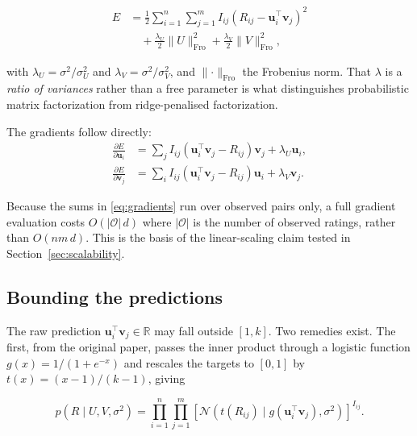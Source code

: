 \documentclass[conference]{IEEEtran}
\begin{document}
\begin{equation}
\begin{split}
  E &= \frac{1}{2}\sum_{i=1}^{n}\sum_{j=1}^{m} I_{ij}\left(R_{ij} - \mathbf{u}_i^\top\mathbf{v}_j\right)^2\\
    &\quad + \frac{\lambda_U}{2}\lVert U\rVert_{\mathrm{Fro}}^2
           + \frac{\lambda_V}{2}\lVert V\rVert_{\mathrm{Fro}}^2,
\end{split}
\label{eq:objective}
\end{equation}

with $\lambda_U = \sigma^2/\sigma_U^2$ and $\lambda_V = \sigma^2/\sigma_V^2$, and
$\lVert\cdot\rVert_{\mathrm{Fro}}$ the Frobenius norm. That $\lambda$ is a \emph{ratio of
variances} rather than a free parameter is what distinguishes probabilistic matrix
factorization from ridge-penalised factorization.

The gradients follow directly:
\begin{equation}
\begin{aligned}
  \frac{\partial E}{\partial \mathbf{u}_i} &= \sum_{j} I_{ij}\left(\mathbf{u}_i^\top\mathbf{v}_j - R_{ij}\right)\mathbf{v}_j + \lambda_U \mathbf{u}_i,\\
  \frac{\partial E}{\partial \mathbf{v}_j} &= \sum_{i} I_{ij}\left(\mathbf{u}_i^\top\mathbf{v}_j - R_{ij}\right)\mathbf{u}_i + \lambda_V \mathbf{v}_j.
\end{aligned}
\label{eq:gradients}
\end{equation}

Because the sums in \eqref{eq:gradients} run over observed pairs only, a full gradient
evaluation costs $O(|\mathcal{O}|\,d)$ where $|\mathcal{O}|$ is the number of observed
ratings, rather than $O(nm\,d)$. This is the basis of the linear-scaling claim tested in
Section~\ref{sec:scalability}.

\subsection{Bounding the predictions}

The raw prediction $\mathbf{u}_i^\top\mathbf{v}_j \in \mathbb{R}$ may fall outside $[1,k]$.
Two remedies exist. The first, from the original paper, passes the inner product through a
logistic function $g(x) = 1/(1+e^{-x})$ and rescales the targets to $[0,1]$ by $t(x) =
(x-1)/(k-1)$, giving

\begin{equation}
  p(R \mid U, V, \sigma^2) =
    \prod_{i=1}^{n}\prod_{j=1}^{m}
    \left[\mathcal{N}\!\left(t(R_{ij}) \mid g(\mathbf{u}_i^\top\mathbf{v}_j), \sigma^2\right)\right]^{I_{ij}}.
  \label{eq:logistic-likelihood}
\end{equation}
\end{document}

